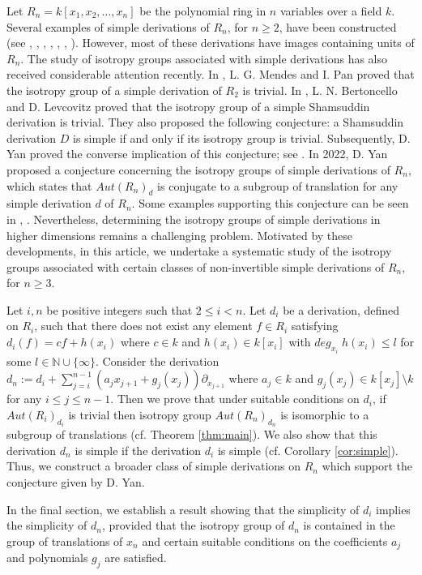 \documentclass[11pt]{amsart}
\theoremstyle{definition}
\theoremstyle{remark}
\numberwithin{equation}{theorem}
\begin{document}
Let $R_n=k[x_1,x_2,\ldots,x_n]$ be the polynomial ring in $n$ variables over a field $k$. Several examples of simple derivations of $R_n$, for $n\geq 2$, have been constructed (see \cite{Now08}, \cite{SP25}, \cite{PS26}, \cite{MMS25'}, \cite{MMS25}, \cite{Kou14}, \cite{Kou12}). However, most of these derivations have images containing units of $R_n$. The study of isotropy groups associated with simple derivations has also received considerable attention recently. In \cite{MP17}, L. G. Mendes and I. Pan proved that the isotropy group of a simple derivation of $R_2$ is trivial. In \cite{BL20}, L. N. Bertoncello and D. Levcovitz proved that the isotropy group of a simple Shamsuddin derivation is trivial. They also proposed the following conjecture: a Shamsuddin derivation $D$ is simple if and only if its isotropy group is trivial. Subsequently, D. Yan proved the converse implication of this conjecture; see \cite[Theorem 2.3]{Yan24}. In 2022, D. Yan proposed a conjecture concerning the isotropy groups of simple derivations of $R_n$, which states that $Aut(R_n)_d$ is conjugate to a subgroup of translation for any simple derivation $d$ of $R_n$. Some examples supporting this conjecture can be seen in \cite{MMS25}, \cite{HY23}. Nevertheless, determining the isotropy groups of simple derivations in higher dimensions remains a challenging problem. Motivated by these developments, in this article, we undertake a systematic study of the isotropy groups associated with certain classes of non-invertible simple derivations of $R_n$, for $n\geq 3$.

Let $i,n$ be positive integers such that $2\leq i<n$. Let $d_i$ be a derivation, defined on $R_i$, such that there does not exist any element $ f\in R_i$ satisfying $d_i(f)=cf+h(x_i)$ where $c\in k$ and $h(x_i)\in k[x_i]$ with $deg_{x_i}\;h(x_i)\leq l$ for some $l\in \mathbb{N}\cup \{\infty\}$. Consider the derivation $d_n:=d_i +\sum_{j=i}^{n-1}(a_j x_{j+1}+g_j(x_j))\partial_{x_{j+1}}$ where $a_j\in k$ and $g_j(x_j)\in k[x_j]\setminus k$ for any $i \leq j \leq n-1$. Then we prove that under suitable conditions on $d_i$, if $Aut(R_i)_{d_i}$ is trivial then isotropy group $Aut(R_n)_{d_n}$ is isomorphic to a subgroup of translations (cf. Theorem \ref{thm:main}). We also show that this derivation $d_n$ is simple if the derivation $d_i$ is simple (cf. Corollary \ref{cor:simple}). Thus, we construct a broader class of simple derivations on $R_n$ which support the conjecture given by D. Yan.

In the final section, we establish a result showing that the simplicity of $d_i$ implies the simplicity of $d_n$, provided that the isotropy group of $d_n$ is contained in the group of translations of $x_n$ and certain suitable conditions on the coefficients $a_j$ and polynomials $g_j$ are satisfied.
\end{document}
